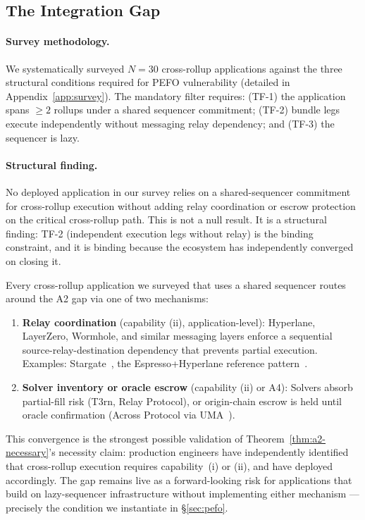 \subsection{The Integration Gap}
\label{sec:gap}

\paragraph{Survey methodology.}
We systematically surveyed $N=30$ cross-rollup applications against the
three structural conditions required for PEFO vulnerability (detailed in
Appendix~\ref{app:survey}). The mandatory filter requires: (TF-1) the
application spans $\geq 2$ rollups under a shared sequencer commitment;
(TF-2) bundle legs execute independently without messaging relay
dependency; and (TF-3) the sequencer is lazy.

\paragraph{Structural finding.}
No deployed application in our survey relies on a shared-sequencer
commitment for cross-rollup execution without adding relay coordination
or escrow protection on the critical cross-rollup path. This is not a
null result. It is a structural finding: TF-2 (independent execution legs
without relay) is the binding constraint, and it is binding because the
ecosystem has independently converged on closing it.

Every cross-rollup application we surveyed that uses a shared sequencer
routes around the A2 gap via one of two mechanisms:

\begin{enumerate}
  \item \textbf{Relay coordination} (capability (ii), application-level):
    Hyperlane, LayerZero, Wormhole, and similar messaging layers enforce
    a sequential source-relay-destination dependency that prevents partial
    execution. Examples: Stargate~\cite{Stargate}, the Espresso+Hyperlane
    reference pattern~\cite{Espresso-Presto}.
  \item \textbf{Solver inventory or oracle escrow} (capability (ii) or
    A4): Solvers absorb partial-fill risk (T3rn, Relay Protocol), or
    origin-chain escrow is held until oracle confirmation (Across Protocol
    via UMA~\cite{Across-Protocol}).
\end{enumerate}

\noindent This convergence is the strongest possible validation of
Theorem~\ref{thm:a2-necessary}'s necessity claim: production engineers
have independently identified that cross-rollup execution requires
capability~(i) or (ii), and have deployed accordingly. The gap
remains live as a forward-looking risk for applications that build
on lazy-sequencer infrastructure without implementing either mechanism ---
precisely the condition we instantiate in \S\ref{sec:pefo}.

